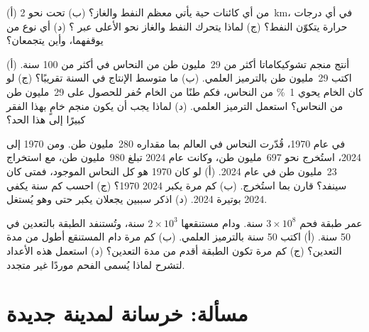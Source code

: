 \begin{exercise}[$\star\star$]\label{exo:g9:earth-resources:9}
(أ) من أي كائنات حية يأتي معظم النفط والغاز؟ (ب) تحت نحو \qty{2}{km}،
في أي درجات حرارة يتكوّن النفط؟ (ج) لماذا يتحرك النفط والغاز نحو الأعلى
عبر ؟ (د) أي نوع من  يوقفهما، وأين
يتجمعان؟
\end{exercise}

\begin{exercise}[$\star\star$]\label{exo:g9:earth-resources:10}
أنتج منجم تشوكيكاماتا أكثر من 29~مليون طن من النحاس في أكثر من 100
سنة. (أ) اكتب 29~مليون طن بالترميز العلمي. (ب) ما متوسط الإنتاج في
السنة تقريبًا؟ (ج) لو كان الخام يحوي \qty{1}{\%} من النحاس، فكم طنًا من
الخام حُفر للحصول على 29~مليون طن من النحاس؟ استعمل الترميز العلمي.
(د) لماذا يجب أن يكون منجم خامٍ بهذا الفقر كبيرًا إلى هذا
الحد؟
\end{exercise}

\begin{exercise}[$\star\star\star$]\label{exo:g9:earth-resources:11}
في عام 1970، قُدّرت  النحاس في العالم بما مقداره 280~مليون
طن. ومن 1970 إلى 2024، استُخرج نحو 697~مليون طن، وكانت  عام
2024 تبلغ 980~مليون طن، مع استخراج 23~مليون طن في عام 2024. (أ) لو كان
 1970 هو كل النحاس الموجود، فمتى كان سينفد؟ قارن بما استُخرج.
(ب) كم مرة يكبر  2024  1970؟ (ج) احسب كم سنة يكفي
 2024 بوتيرة 2024. (د) اذكر سببين يجعلان  يكبر حتى وهو
يُستغل.
\end{exercise}

\begin{exercise}[$\star\star\star$]\label{exo:g9:earth-resources:12}
عمر طبقة فحم $3 \times 10^8$ سنة. ودام مستنقعها $2 \times 10^3$
سنة، وتُستنفد الطبقة بالتعدين في 50 سنة. (أ) اكتب 50 سنة بالترميز
العلمي. (ب) كم مرة دام المستنقع أطول من مدة التعدين؟ (ج) كم مرة تكون
الطبقة أقدم من مدة التعدين؟ (د) استعمل هذه الأعداد لتشرح لماذا يُسمى
الفحم موردًا غير
متجدد.
\end{exercise}

\section{مسألة: خرسانة لمدينة جديدة}

